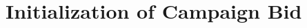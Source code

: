 \documentclass[../main.tex]{subfiles}
\begin{document}
	\chapter{Initialization of Campaign Bid}
	
	
	
	
\end{document}
